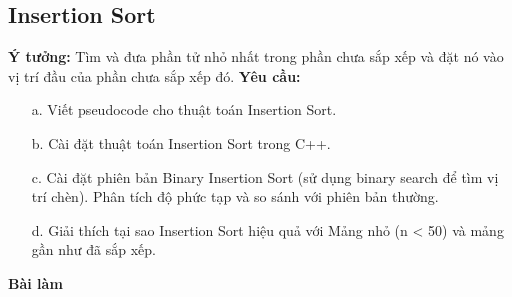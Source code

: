 \documentclass[12pt,a4paper]{article}
\begin{document}
\subsection{Insertion Sort}
\textbf{Ý tưởng: }Tìm và đưa phần tử nhỏ nhất trong phần chưa sắp xếp và đặt nó vào vị trí
đầu của phần chưa sắp xếp đó.
\textbf{Yêu cầu:}

\begin{enumerate}
    \item[a.] Viết pseudocode cho thuật toán Insertion Sort.
    \item[b.] Cài đặt thuật toán Insertion Sort trong C++.
    \item[c.] Cài đặt phiên bản Binary Insertion Sort 
              (sử dụng binary search để tìm vị trí chèn).
              Phân tích độ phức tạp và so sánh với phiên bản thường.
    \item[d.] Giải thích tại sao Insertion Sort hiệu quả với Mảng nhỏ 
              (n < 50) và mảng gần như đã sắp xếp.
\end{enumerate}

\begin{center}
    \textbf{Bài làm}
\end{center}
\end{document}
